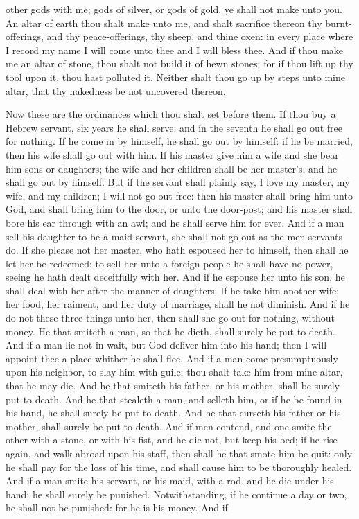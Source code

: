 other gods with me; gods of silver, or gods of gold, ye shall not make unto you. An altar of earth thou shalt make unto me, and shalt sacrifice thereon thy burnt-offerings, and thy peace-offerings, thy sheep, and thine oxen: in every place where I record my name I will come unto thee and I will bless thee. And if thou make me an altar of stone, thou shalt not build it of hewn stones; for if thou lift up thy tool upon it, thou hast polluted it. Neither shalt thou go up by steps unto mine altar, that thy nakedness be not uncovered thereon. 

Now these are the ordinances which thou shalt set before them.  If thou buy a Hebrew servant, six years he shall serve: and in the seventh he shall go out free for nothing. If he come in by himself, he shall go out by himself: if he be married, then his wife shall go out with him. If his master give him a wife and she bear him sons or daughters; the wife and her children shall be her master’s, and he shall go out by himself. But if the servant shall plainly say, I love my master, my wife, and my children; I will not go out free: then his master shall bring him unto God, and shall bring him to the door, or unto the door-post; and his master shall bore his ear through with an awl; and he shall serve him for ever.  And if a man sell his daughter to be a maid-servant, she shall not go out as the men-servants do. If she please not her master, who hath espoused her to himself, then shall he let her be redeemed: to sell her unto a foreign people he shall have no power, seeing he hath dealt deceitfully with her. And if he espouse her unto his son, he shall deal with her after the manner of daughters. If he take him another wife; her food, her raiment, and her duty of marriage, shall he not diminish. And if he do not these three things unto her, then shall she go out for nothing, without money.  He that smiteth a man, so that he dieth, shall surely be put to death. And if a man lie not in wait, but God deliver him into his hand; then I will appoint thee a place whither he shall flee. And if a man come presumptuously upon his neighbor, to slay him with guile; thou shalt take him from mine altar, that he may die.  And he that smiteth his father, or his mother, shall be surely put to death.  And he that stealeth a man, and selleth him, or if he be found in his hand, he shall surely be put to death.  And he that curseth his father or his mother, shall surely be put to death.  And if men contend, and one smite the other with a stone, or with his fist, and he die not, but keep his bed; if he rise again, and walk abroad upon his staff, then shall he that smote him be quit: only he shall pay for the loss of his time, and shall cause him to be thoroughly healed.  And if a man smite his servant, or his maid, with a rod, and he die under his hand; he shall surely be punished. Notwithstanding, if he continue a day or two, he shall not be punished: for he is his money.  And if 